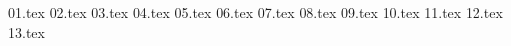 \documentclass[a4paper,12pt,norsk]{article}
\begin{document}
\maketitle
\pagebreak
\tableofcontents

\pagebreak
{01.tex}
\pagebreak
{02.tex}
\pagebreak
{03.tex}
\pagebreak
{04.tex}
\pagebreak
{05.tex}
\pagebreak
{06.tex}
\pagebreak
{07.tex}
\pagebreak
{08.tex}
\pagebreak
{09.tex}
\pagebreak
{10.tex}
\pagebreak
{11.tex}
\pagebreak
{12.tex}
\pagebreak
{13.tex}
\end{document}
